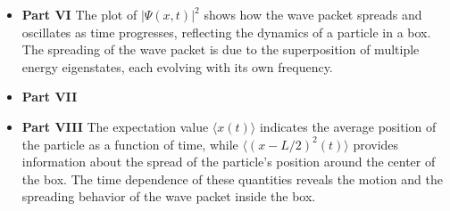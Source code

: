 \documentclass{article}
\begin{document}
\begin{adjustwidth}{5pt}{5pt}
\begin{itemize}
    \vspace{0.2cm}
    \item[] \textbf{Part VI} The plot of $|\Psi(x, t)|^2$ shows how the wave packet spreads and oscillates as time progresses, reflecting the dynamics of a particle in a box. The spreading of the wave packet is due to the superposition of multiple energy eigenstates, each evolving with its own frequency.
    
    \vspace{0.2cm}
    \item[] \textbf{Part VII}
    
    \vspace{0.2cm}
    \item[] \textbf{Part VIII} The expectation value $\langle x(t) \rangle$ indicates the average position of the particle as a function of time, while $\langle (x - L/2)^2(t) \rangle$ provides information about the spread of the particle's position around the center of the box. The time dependence of these quantities reveals the motion and the spreading behavior of the wave packet inside the box.
\end{itemize}

\end{adjustwidth}
\end{document}
